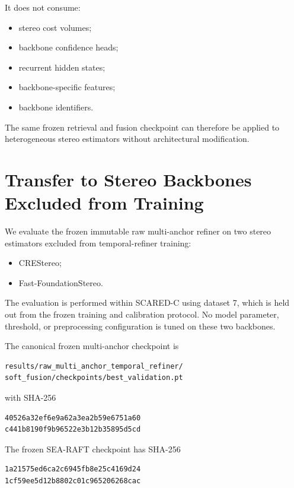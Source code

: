 \documentclass[11pt,a4paper]{article}
\begin{document}
It does not consume:

\begin{itemize}
    \item stereo cost volumes;
    \item backbone confidence heads;
    \item recurrent hidden states;
    \item backbone-specific features;
    \item backbone identifiers.
\end{itemize}

The same frozen retrieval and fusion checkpoint can therefore be applied
to heterogeneous stereo estimators without architectural modification.

\section{Transfer to Stereo Backbones Excluded from Training}
\label{sec:unseen_backbone_transfer}

We evaluate the frozen immutable raw multi-anchor refiner on two stereo
estimators excluded from temporal-refiner training:

\begin{itemize}
    \item CREStereo;
    \item Fast-FoundationStereo.
\end{itemize}

The evaluation is performed within SCARED-C using dataset 7, which is
held out from the frozen training and calibration protocol.
No model parameter, threshold, or preprocessing configuration is tuned
on these two backbones.

The canonical frozen multi-anchor checkpoint is

\begin{verbatim}
results/raw_multi_anchor_temporal_refiner/
soft_fusion/checkpoints/best_validation.pt
\end{verbatim}

with SHA-256

\begin{verbatim}
40526a32ef6e9a62a3ea2b59e6751a60
c441b8190f9b96522e3b12b35895d5cd
\end{verbatim}

The frozen SEA-RAFT checkpoint has SHA-256

\begin{verbatim}
1a21575ed6ca2c6945fb8e25c4169d24
1cf59ee5d12b8802c01c965206268cac
\end{verbatim}
\end{document}
